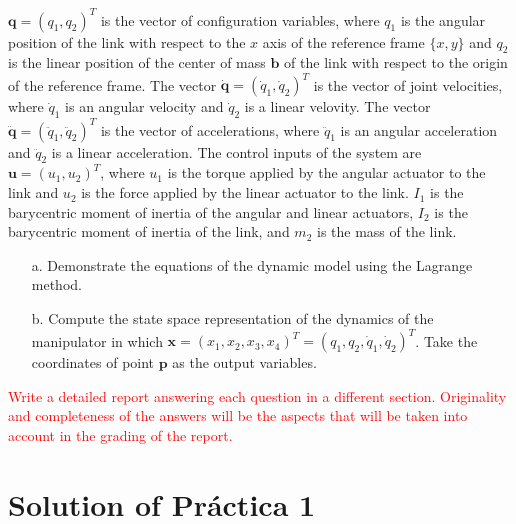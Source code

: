 \documentclass{article}
\begin{document}
$
\mathbf{q} =
(
q_1, q_2
)^T
$ 
is the vector of configuration variables, where $q_1$ is the
angular position of the link with respect to the $x$ axis of the reference
frame $\{x, y\}$ and $q_2$ is the linear position of the center of mass $\mathbf{b}$ of the link with respect to the origin of the reference frame.
The
vector
$
\dot{\mathbf{q}} =
(\dot{q}_1,
\dot{q}_2)^T
$ 
is the vector of joint velocities, where $\dot{q}_1$ is an angular
velocity and $\dot{q}_2$ is a linear velovity. The vector
$
\ddot{\mathbf{q}} =
(\ddot{q}_1,
\ddot{q}_2)^T
$
is the vector of accelerations, where  $\ddot{q}_1$ is an angular
acceleration and $\ddot{q}_2$ is a linear acceleration. The control inputs of the system are
$
\mathbf{u} =
(u_1,
u_2)^T
$,
where $u_1$ is the torque applied by the angular actuator to the link and
$u_2$ is the force applied by the linear actuator to the link. 
$I_1$ is the barycentric moment of inertia of the angular and linear actuators,
$I_2$ is the barycentric moment of inertia of the link, and $m_2$ is the mass of the link.








\begin{itemize}
\item[a.] Demonstrate the equations of the dynamic model using the Lagrange method.


\item[b.] 
Compute the state space representation of the dynamics of the manipulator in which $\mathbf{x} = (x_1,x_2,x_3,x_4)^T= (q_1, q_2, \dot{q}_1, \dot{q}_2)^T$. Take the coordinates of point $\mathbf{p}$ as the output variables.


\end{itemize}



\noindent
\textcolor{red}{Write a detailed report answering each question in a different section. 
Originality and completeness of the answers will be the aspects that will be taken into account in the grading of the report. 
} 

\newpage













\section*{Solution of Práctica 1}
\end{document}
